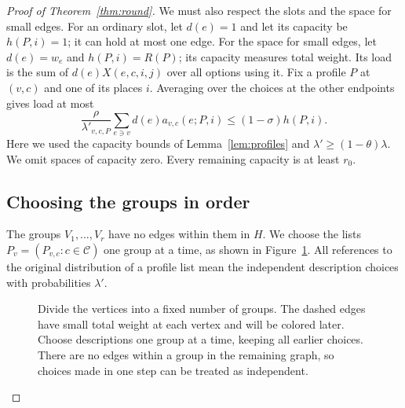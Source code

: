 \documentclass[11pt]{article}
\theoremstyle{definition}\newtheorem{algorithm}{Algorithm}[section]
\numberwithin{equation}{section}
\theoremstyle{remark}\newtheorem*{remark}{Remark}
\newcommand{\cC}{\mathcal C}
\begin{document}
\begin{proof}[Proof of Theorem~\ref{thm:round}]
We must also respect the slots and the space for small edges. For an
ordinary slot, let $d(e)=1$ and let its capacity be $h(P,i)=1$; it can
hold at most one edge. For the space for small edges, let $d(e)=w_e$ and
$h(P,i)=R(P)$; its capacity measures total weight. Its load is the sum
of $d(e)X(e,c,i,j)$ over all options using it.
Fix a profile $P$ at $(v,c)$ and one of its places $i$. Averaging over
the choices at the other endpoints gives load at most
\begin{equation}\label{eq:meanload}
 \frac{\rho}{\lambda'_{v,c,P}}
       \sum_{e\ni v}d(e)a_{v,c}(e;P,i)
 \le (1-\sigma)h(P,i).
\end{equation}
Here we used the capacity bounds of Lemma~\ref{lem:profiles} and
$\lambda'\ge(1-\theta)\lambda$. We omit spaces of capacity zero.
Every remaining capacity is at least $r_0$.

\subsection*{Choosing the groups in order}
The groups $V_1,\ldots,V_r$ have no edges within them in $H$.
We choose the lists $P_v=(P_{v,c}:c\in\cC)$ one group at a time,
as shown in Figure~\ref{fig:group-passes}. All references to the original distribution of a profile list mean
the independent description choices with probabilities $\lambda'$.


\begin{figure}[htbp]
\centering
{}
\caption{Divide the vertices into a fixed number of groups. The dashed
edges have small total weight at each vertex and will be colored later.
Choose descriptions one group at a time, keeping all earlier choices.
There are no edges within a group in the remaining graph, so choices
made in one step can be treated as independent.}
\label{fig:group-passes}
\end{figure}


\end{proof}
\end{document}
